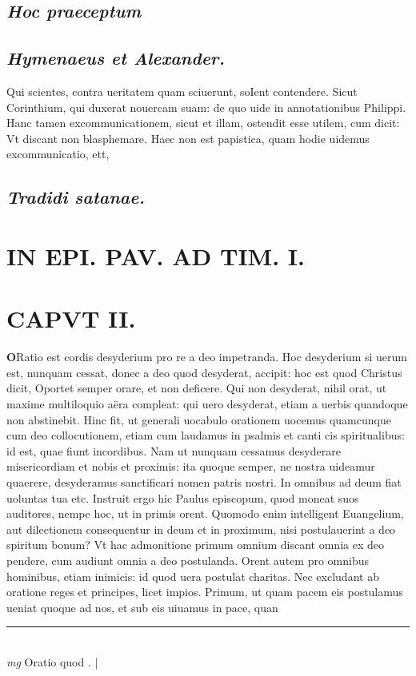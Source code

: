 \documentclass{article}
\begin{document}
\begin{pages}
\subsection*{\textit{Hoc praeceptum }}
{}
\subsection*{\textit{Hymenaeus et Alexander. }}\pstart Qui scientes, contra ueritatem quam sciuerunt, soIent contendere.  \pend\pstart Sicut Corinthium, qui duxerat nouercam suam: de quo uide in annotationibus Philippi. Hanc tamen excommunicationem, sicut et illam, ostendit esse utilem, cum dicit: Vt discant non blasphemare. Haec non est papistica, quam hodie uidemus excommunicatio, ett,  \pend
{}
{}
\subsection*{\textit{Tradidi satanae. }}
\section*{IN EPI. PAV. AD TIM. I. }
\marginpar{[ p.83 ]}
\endnumbering\beginnumbering\section{CAPVT II.}\pstart \huge\textbf{O}\normalsize Ratio est cordis desyderium pro re a deo impetranda. Hoc desyderium si uerum est, nunquam cessat, donec a deo quod desyderat, accipit: hoc est quod Christus dicit, Oportet semper orare, et non deficere. Qui non desyderat, nihil orat, ut maxime multiloquio aëra compleat: qui uero desyderat, etiam a uerbis quandoque  non abstinebit. Hinc fit, ut generali uocabulo orationem uocemus quamcunque  cum deo collocutionem, etiam cum laudamus in psalmis et canti cis spiritualibus: id est, quae fiunt incordibus. Nam ut nunquam cessamus desyderare misericordiam et nobis et proximis: ita quoque  semper, ne nostra uideamur quaerere, desyderamus sanctificari nomen patris nostri. In omnibus ad deum fiat uoluntas tua etc. Instruit ergo hic Paulus episcopum, quod moneat suos auditores, nempe hoc, ut in primis orent. Quomodo enim intelligent Euangelium, aut dilectionem consequentur in deum et in proximum, nisi postulauerint a deo spiritum bonum? Vt hac admonitione primum omnium discant omnia ex deo pendere, cum audiunt omnia a deo postulanda. Orent autem pro omnibus hominibus, etiam inimicis: id quod uera postulat charitas. Nec excludant ab oratione reges et principes, licet impios. Primum, ut quam pacem eis postulamus ueniat quoque  ad nos, et sub eis uiuamus in pace, quan\pend
\vspace{0.5cm}\noindent
\vspace{0.2cm}\rule{1cm}{0.2pt}\\ 
\hspace{0.2cm}\textit{mg}
\footnotesize Oratio quod . 
\normalsize| 

\end{pages}
\end{document}
